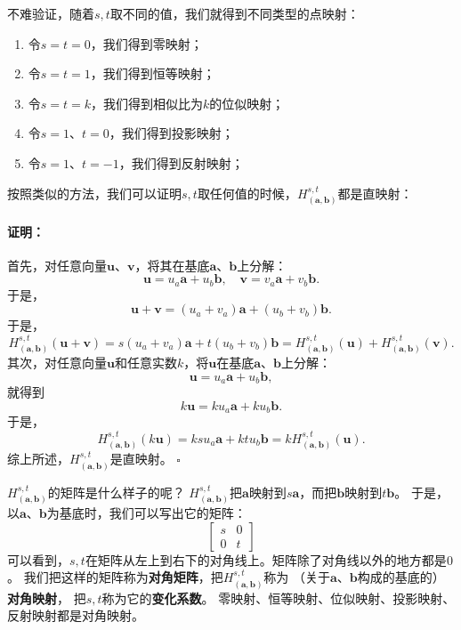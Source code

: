\documentclass[12pt,UTF8]{ctexbook}
\renewenvironment{proof}{\paragraph{\textbf{证明：}}}{\hfill$\square$}
\begin{document}
不难验证，随着$s,t$取不同的值，我们就得到不同类型的点映射：
\begin{enumerate}
    \item 令$s = t = 0$，我们得到零映射；
    \item 令$s = t = 1$，我们得到恒等映射；
    \item 令$s = t = k$，我们得到相似比为$k$的位似映射；
    \item 令$s = 1$、$t = 0$，我们得到投影映射；
    \item 令$s = 1$、$t = -1$，我们得到反射映射；
\end{enumerate}
按照类似的方法，我们可以证明$s,t$取任何值的时候，$H_{(\mathbf{a},\mathbf{b})}^{s, t}$都是直映射：
\begin{proof}
    首先，对任意向量$\mathbf{u}$、$\mathbf{v}$，将其在基底$\mathbf{a}$、$\mathbf{b}$上分解：
    $$ \mathbf{u} = u_a \mathbf{a} + u_b \mathbf{b},\quad \mathbf{v} = v_a \mathbf{a} + v_b \mathbf{b}.$$
    于是，
    $$ \mathbf{u} + \mathbf{v} = (u_a + v_a) \mathbf{a} + (u_b + v_b) \mathbf{b}. $$
    于是，
    $$ H_{(\mathbf{a},\mathbf{b})}^{s, t} (\mathbf{u} + \mathbf{v}) = s(u_a + v_a) \mathbf{a} + t(u_b + v_b) \mathbf{b} = H_{(\mathbf{a},\mathbf{b})}^{s, t} (\mathbf{u}) + H_{(\mathbf{a},\mathbf{b})}^{s, t} (\mathbf{v}).$$
    其次，对任意向量$\mathbf{u}$和任意实数$k$，将$\mathbf{u}$在基底$\mathbf{a}$、$\mathbf{b}$上分解：
    $$ \mathbf{u} = u_a \mathbf{a} + u_b \mathbf{b},$$
    就得到
    $$ k\mathbf{u} = ku_a \mathbf{a} + ku_b \mathbf{b}.$$
    于是，
    $$ H_{(\mathbf{a},\mathbf{b})}^{s, t} (k\mathbf{u}) = ksu_a \mathbf{a} + ktu_b \mathbf{b} = k H_{(\mathbf{a},\mathbf{b})}^{s, t} (\mathbf{u}). $$
    综上所述，$H_{(\mathbf{a},\mathbf{b})}^{s, t}$是直映射。
\end{proof}

$H_{(\mathbf{a},\mathbf{b})}^{s, t}$的矩阵是什么样子的呢？
$H_{(\mathbf{a},\mathbf{b})}^{s, t}$把$\mathbf{a}$映射到$s\mathbf{a}$，而把$\mathbf{b}$映射到$t\mathbf{b}$。
于是，以$\mathbf{a}$、$\mathbf{b}$为基底时，我们可以写出它的矩阵：
$$
\begin{bmatrix}
    s & 0 \\ 0 & t
\end{bmatrix}
$$
可以看到，$s,t$在矩阵从左上到右下的对角线上。矩阵除了对角线以外的地方都是$0$。
我们把这样的矩阵称为\textbf{对角矩阵}，把$H_{(\mathbf{a},\mathbf{b})}^{s, t}$称为
（关于$\mathbf{a}$、$\mathbf{b}$构成的基底的）\textbf{对角映射}，
把$s,t$称为它的\textbf{变化系数}。
零映射、恒等映射、位似映射、投影映射、反射映射都是对角映射。
\end{document}
